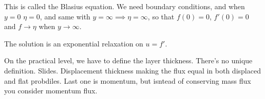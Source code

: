 \documentclass[palatino]{epflnotes}
\begin{document}
This is called the Blasius equation. We need boundary conditions, and when $y = 0$ $η = 0$, and same with $y = ∞ \implies η = ∞$, so that $f(0) = 0$, $f'(0) = 0$ and $f \to η$ when $y \to ∞$.

The solution is an exponential relaxation on $u = f'$.

On the practical level, we have to define the layer thickness. There's no unique definition.  Slides. Displacement thickness making the flux equal in both displaced and flat probdiles. Last one is momentum, but isntead of conserving mass flux you consider momentum flux.

\appendix

\backmatter
\printindex
\end{document}
